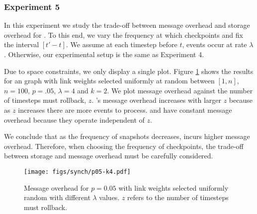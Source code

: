 \begin{figure*}[t]
\centering
{}
\caption{Message overhead for $p=0.05$ \er with link weights selected uniformly random with different $\lambda$ values.}
\label{fig:lc-p05}
\end{figure*} 


\subsubsection{Experiment 5}

In this experiment we study the trade-off between message overhead and storage overhead for \cprs. To this end, we vary the frequency at which \cpr checkpoints and fix 
the interval $[t'-t]$. We assume at each timestep before $t$, \lcd events occur at rate $\lambda$. Otherwise, our experimental setup is the same as Experiment 4.

Due to space constraints, we only display a single plot. Figure \ref{fig:lc-fixk} shows the results for an \er graph with link weights selected uniformly at random between $[1,n]$,
$n=100$, $p=.05$, $\lambda=4$ and $k=2$. We plot message overhead against the number of timesteps \cpr must rollback, $z$. \cprs's message overhead increases with larger $z$ 
because as $z$ increases there are more \lcd events to process. \second and \purge have constant message overhead because they operate independent of $z$.

We conclude that as the frequency of \cpr snapshots decreases, \cpr incurs higher message overhead.  Therefore, when choosing the frequency of checkpoints,
the trade-off between storage and message overhead must be carefully considered. 


\begin{figure}[t]
\centering
\texttt{[image: figs/synch/p05-k4.pdf]}
\caption{Message overhead for $p=0.05$ \er with link weights selected uniformly random with different $\lambda$ values. $z$ refers to the number of timesteps \cpr must 
rollback.}
\label{fig:lc-fixk}
\end{figure} 


